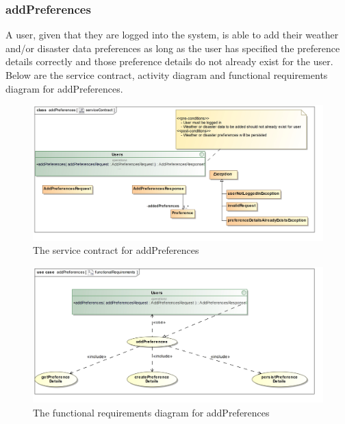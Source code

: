 \subsubsection{addPreferences}

A user, given that they are logged into the system, is able to add their weather and/or disaster data preferences as long as the user has specified the preference details correctly and those preference details do not already exist for the user. Below are the service contract, activity diagram and functional requirements diagram for addPreferences.

\begin{figure}[H]
	\centering
	\includegraphics[width=1.0\textwidth]{../images/funcReq/addPreferencesServiceContract.jpg}
	\caption{The service contract for addPreferences \label{overflow}}
\end{figure}

\begin{figure}[H]
	\centering
	\includegraphics[width=1.0\textwidth]{../images/funcReq/addPreferencesFunctionalRequirements.jpg}
	\caption{The functional requirements diagram for addPreferences \label{overflow}}
\end{figure}

